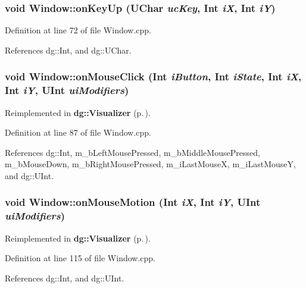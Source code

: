 \subsubsection{\setlength{\rightskip}{0pt plus 5cm}void Window::on\-Key\-Up ({\bf UChar} {\em uc\-Key}, {\bf Int} {\em i\-X}, {\bf Int} {\em i\-Y})\hspace{0.3cm}{\tt  [virtual]}}\label{classdg_1_1Window_a11}




Definition at line 72 of file Window.cpp.

References dg::Int, and dg::UChar.
\subsubsection{\setlength{\rightskip}{0pt plus 5cm}void Window::on\-Mouse\-Click ({\bf Int} {\em i\-Button}, {\bf Int} {\em i\-State}, {\bf Int} {\em i\-X}, {\bf Int} {\em i\-Y}, {\bf UInt} {\em ui\-Modifiers})\hspace{0.3cm}{\tt  [virtual]}}\label{classdg_1_1Window_a16}




Reimplemented in {\bf dg::Visualizer} {\rm (p.\,\pageref{classdg_1_1Visualizer_a10})}.

Definition at line 87 of file Window.cpp.

References dg::Int, m\_\-b\-Left\-Mouse\-Pressed, m\_\-b\-Middle\-Mouse\-Pressed, m\_\-b\-Mouse\-Down, m\_\-b\-Right\-Mouse\-Pressed, m\_\-i\-Last\-Mouse\-X, m\_\-i\-Last\-Mouse\-Y, and dg::UInt.
\subsubsection{\setlength{\rightskip}{0pt plus 5cm}void Window::on\-Mouse\-Motion ({\bf Int} {\em i\-X}, {\bf Int} {\em i\-Y}, {\bf UInt} {\em ui\-Modifiers})\hspace{0.3cm}{\tt  [virtual]}}\label{classdg_1_1Window_a15}




Reimplemented in {\bf dg::Visualizer} {\rm (p.\,\pageref{classdg_1_1Visualizer_a9})}.

Definition at line 115 of file Window.cpp.

References dg::Int, and dg::UInt.
